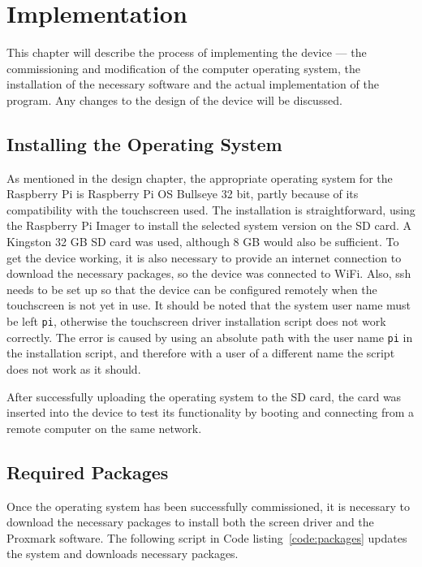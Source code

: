 \chapter{Implementation}

This chapter will describe the process of implementing the device --- the commissioning and modification of the computer operating system, the installation of the necessary software and the actual implementation of the program. Any changes to the design of the device will be discussed.

\section{Installing the Operating System}

As mentioned in the design chapter, the appropriate operating system for the Raspberry Pi is Raspberry Pi OS Bullseye 32 bit, partly because of its compatibility with the touchscreen used. The installation is straightforward, using the Raspberry Pi Imager to install the selected system version on the SD card. A Kingston 32 GB SD card was used, although 8 GB would also be sufficient. To get the device working, it is also necessary to provide an internet connection to download the necessary packages, so the device was connected to WiFi. Also, ssh needs to be set up so that the device can be configured remotely when the touchscreen is not yet in use. It should be noted that the system user name must be left \texttt{pi}, otherwise the touchscreen driver installation script does not work correctly. The error is caused by using an absolute path with the user name \texttt{pi} in the installation script, and therefore with a user of a different name the script does not work as it should.   

After successfully uploading the operating system to the SD card, the card was inserted into the device to test its functionality by booting and connecting from a remote computer on the same network.  

\section{Required Packages}

Once the operating system has been successfully commissioned, it is necessary to download the necessary packages to install both the screen driver and the Proxmark software. The following script in Code listing~\ref{code:packages} updates the system and downloads necessary packages.

